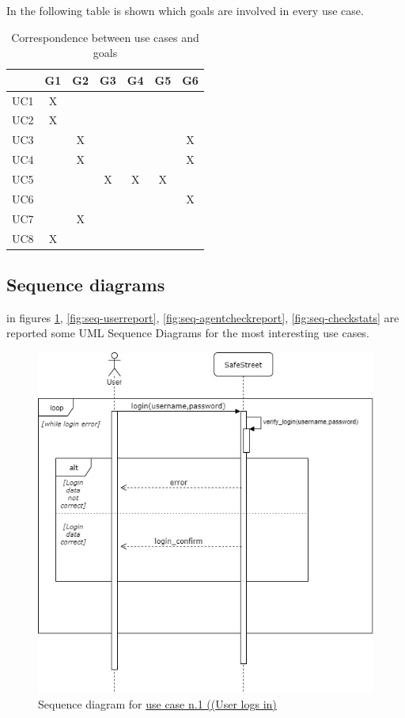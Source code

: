 \documentclass[a4paper]{report}
\begin{document}
In the following table is shown which goals are involved in every use case.
\begin{table}[H]  
  \centering
  \begin{tabular}{|c|c|c|c|c|c|c|}
    \cline{2-7}
    \multicolumn{1}{c|}{} & G1 & G2 & G3 & G4 & G5 & G6 \\ \hline
    UC1 & X &   &   &   &   &   \\ \hline
    UC2 & X &   &   &   &   &   \\ \hline
    UC3 &   & X &   &   &   & X \\ \hline
    UC4 &   & X &   &   &   & X \\ \hline
    UC5 &   &   & X & X & X &   \\ \hline
    UC6 &   &   &   &   &   & X \\ \hline
    UC7 &   & X &   &   &   &   \\ \hline
    UC8 & X &   &   &   &   &   \\ \hline
  \end{tabular}
  \caption{Correspondence between use cases and goals}
\end{table}


\subsection{Sequence diagrams}
in figures \ref{fig:seq-userlogin}, \ref{fig:seq-userreport}, \ref{fig:seq-agentcheckreport}, \ref{fig:seq-checkstats} are reported some UML Sequence Diagrams for the most interesting use cases. \\
\begin{figure}[htp]
\includegraphics[width=\textwidth]{SequenceUserLogin}
\caption{Sequence diagram for \hyperref[uc:1]{use case n.1 ((User logs in)} }
\label{fig:seq-userlogin}
\end{figure}
\end{document}

